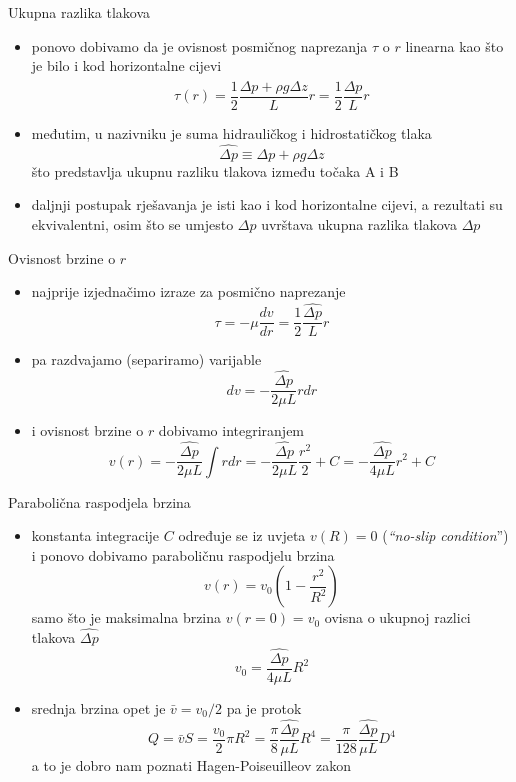 \documentclass[croatian]{beamer}
\begin{document}
\begin{frame}{Ukupna razlika tlakova}

\begin{itemize}
\item ponovo dobivamo da je ovisnost posmičnog naprezanja $\tau$ o $r$
linearna kao što je bilo i kod horizontalne cijevi
\[
\tau(r)=\frac{1}{2}\frac{\Delta p+\rho g\Delta z}{L}r=\frac{1}{2}\frac{\widehat{\Delta p}}{L}r
\]
\item međutim, u nazivniku je suma hidrauličkog i hidrostatičkog tlaka 
\[
\widehat{\Delta p}\equiv\Delta p+\rho g\Delta z
\]
 što predstavlja ukupnu razliku tlakova između točaka A i B
\item daljnji postupak rješavanja je isti kao i kod horizontalne cijevi,
a rezultati su ekvivalentni, osim što se umjesto $\Delta p$ uvrštava
ukupna razlika tlakova $\widehat{\Delta p}$
\end{itemize}
\end{frame}

\begin{frame}{Ovisnost brzine o $r$}

\begin{itemize}
\item najprije izjednačimo izraze za posmično naprezanje
\[
\tau=-\mu\frac{dv}{dr}=\frac{1}{2}\frac{\widehat{\Delta p}}{L}r
\]
\item pa razdvajamo (separiramo) varijable
\[
dv=-\frac{\widehat{\Delta p}}{2\mu L}rdr
\]
\item i ovisnost brzine o $r$ dobivamo integriranjem
\[
v(r)=-\frac{\widehat{\Delta p}}{2\mu L}\int rdr=-\frac{\widehat{\Delta p}}{2\mu L}\frac{r^{2}}{2}+C=-\frac{\widehat{\Delta p}}{4\mu L}r^{2}+C
\]
\end{itemize}
\end{frame}

\begin{frame}{Parabolična raspodjela brzina}

\begin{itemize}
\item konstanta integracije $C$ određuje se iz uvjeta $v(R)=0$ (\emph{``no-slip
condition}'') i ponovo dobivamo paraboličnu raspodjelu brzina
\[
v(r)=v_{0}\left(1-\frac{r^{2}}{R^{2}}\right)
\]
samo što je maksimalna brzina $v(r=0)=v_{0}$ ovisna o ukupnoj razlici
tlakova $\widehat{\Delta p}$
\[
v_{0}=\frac{\widehat{\Delta p}}{4\mu L}R^{2}
\]
\item srednja brzina opet je $\bar{v}=v_{0}/2$ pa je protok
\[
Q=\bar{v}S=\frac{v_{0}}{2}\pi R^{2}=\frac{\pi}{8}\frac{\widehat{\Delta p}}{\mu L}R^{4}=\frac{\pi}{128}\frac{\widehat{\Delta p}}{\mu L}D^{4}
\]
a to je dobro nam poznati \alert{Hagen-Poiseuilleov zakon}
\end{itemize}
\end{frame}
\end{document}
